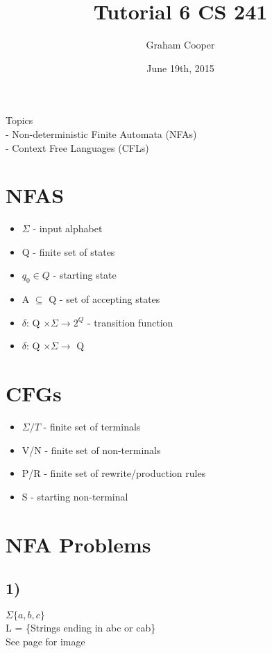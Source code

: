 \documentclass[12pt]{article}
\title{\vspace{-15ex}Tutorial 6 CS 241\vspace{-1ex}}
\date{June 19th, 2015}
\author{Graham Cooper}
\begin{document}
	\maketitle
	
	Topics\\
	- Non-deterministic Finite Automata (NFAs)\\
	- Context Free Languages (CFLs)\\
	
	\section*{NFAS}
	\begin{itemize}
		\item $\Sigma$ - input alphabet
		\item Q - finite set of states
		\item $q_0 \in Q$ - starting state
		\item A $\subseteq$ Q - set of accepting states
		\item $\delta$: Q $\times \Sigma \rightarrow 2^Q$ - transition function
		\item $\delta$: Q $\times \Sigma \rightarrow$ Q
	\end{itemize}
	
	\section*{CFGs}
	\begin{itemize}
		\item $\Sigma/T$ - finite set of terminals
		\item V/N - finite set of non-terminals
		\item P/R - finite set of rewrite/production rules
		\item S - starting non-terminal
	\end{itemize}
	
	\section*{NFA Problems}
	
	\subsection*{1)}
	$\Sigma \{a,b,c\}$\\
	L = \{Strings ending in abc or cab\}\\
	
	See page for image
	
\end{document}
